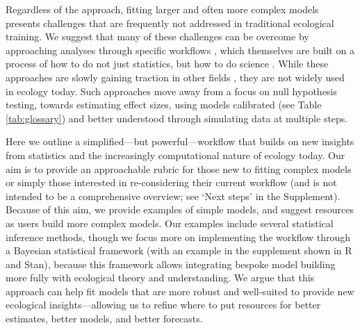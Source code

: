 \documentclass[11pt]{article}
\begin{document}
Regardless of the approach, fitting larger and often more complex models presents challenges that are frequently not addressed in traditional ecological training. We suggest that many of these challenges can be overcome by approaching analyses through specific workflows \citep{betanworkflow,grinsztajn2021,vandeschoot2021}, which themselves are built on a process of how to do not just statistics, but how to do science \citep{box1976science}. While these approaches are slowly gaining traction in other fields \citep[e.g.,][]{esfahani2021bayesian,schad2021,bouman2024bayesian}, they are not widely used in ecology today. Such approaches move away from a focus on null hypothesis testing, towards estimating effect sizes, using models calibrated (see Table \ref{tab:glossary}) and better understood through simulating data at multiple steps. %

Here we outline a simplified---but powerful---workflow that builds on new insights from statistics  \citep{betanworkflow,gelman2020bayesian,vandeschoot2021} and the increasingly computational nature of ecology today. Our aim is to provide an approachable rubric for those new to fitting complex models or simply those interested in re-considering their current workflow (and is not intended to be a comprehensive overview; see `Next steps' in the Supplement). Because of this aim, we provide examples of simple models, and suggest resources as users build more complex models. Our examples include several statistical inference methods, though we focus more on implementing the workflow through a Bayesian statistical framework (with an example in the supplement shown in \textsf{R} and \textsf{Stan}), because this framework allows integrating bespoke model building more fully with ecological theory and understanding.  We argue that this approach can help fit models that are more robust and well-suited to provide new ecological insights---allowing us to refine where to put resources for better estimates, better models, and better forecasts.
\end{document}
